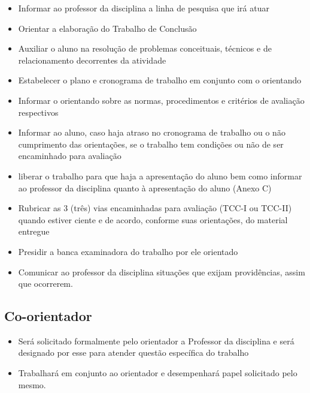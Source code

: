 	\begin{itemize}
		\item Informar ao professor da disciplina a linha de pesquisa que irá atuar
	
		\item Orientar a elaboração do Trabalho de Conclusão
	
		\item Auxiliar o aluno na resolução de problemas conceituais, técnicos e de relacionamento decorrentes da atividade
	
		\item Estabelecer o plano e cronograma de trabalho em conjunto com o orientando
	
		\item Informar o orientando sobre as normas, procedimentos e critérios de avaliação respectivos
	
		\item Informar ao aluno, caso haja atraso no cronograma de trabalho ou o não cumprimento das orientações, se o trabalho tem condições ou não de ser 
		encaminhado para avaliação
	
		\item liberar o trabalho para que haja a apresentação do aluno bem como informar ao professor da disciplina quanto à apresentação do aluno (Anexo C)
	
		\item Rubricar as 3 (três) vias encaminhadas para avaliação (TCC-I ou TCC-II) quando estiver ciente e de acordo, 
		conforme suas orientações, do material entregue
	
		\item Presidir a banca examinadora do trabalho por ele orientado
	
		\item Comunicar ao professor da disciplina situações que exijam providências, assim que ocorrerem.
	\end{itemize}


\subsection{Co-orientador}

	\begin{itemize}	
		\item Será solicitado formalmente pelo orientador a Professor da disciplina e será designado por esse para atender questão específica do trabalho
		
		\item Trabalhará em conjunto ao orientador e desempenhará papel solicitado pelo mesmo.
	\end{itemize}


